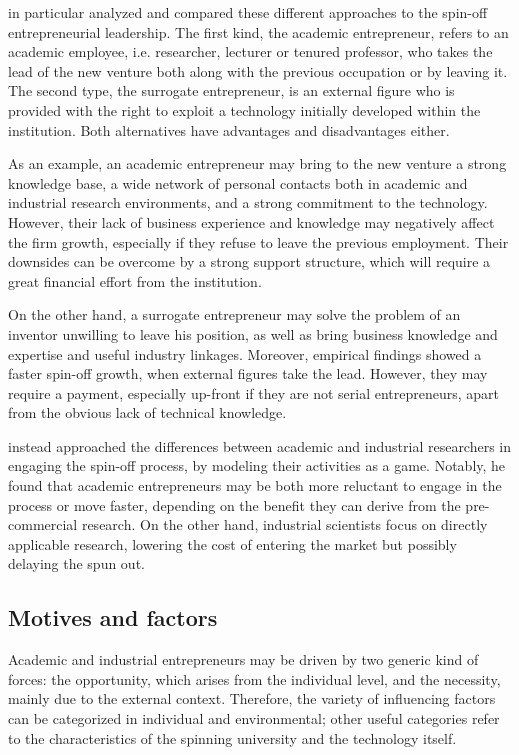 \citet{Radosevich1995} in particular analyzed and compared these different approaches to the spin-off entrepreneurial leadership. The first kind, the academic entrepreneur, refers to an academic employee, i.e. researcher, lecturer or tenured professor, who takes the lead of the new venture both along with the previous occupation or by leaving it. The second type, the surrogate entrepreneur, is an external figure who is provided with the right to exploit a technology initially developed within the institution. Both alternatives have advantages and disadvantages either.

As an example, an academic entrepreneur may bring to the new venture a strong knowledge base, a wide network of personal contacts both in academic and industrial research environments, and a strong commitment to the technology. However, their lack of business experience and knowledge may negatively affect the firm growth, especially if they refuse to leave the previous employment. Their downsides can be overcome by a strong support structure, which will require a great financial effort from the institution. 

On the other hand, a surrogate entrepreneur may solve the problem of an inventor unwilling to leave his position, as well as bring business knowledge and expertise and useful industry linkages. Moreover, empirical findings showed a faster spin-off growth, when external figures take the lead. However, they may require a payment, especially up-front if they are not serial entrepreneurs, apart from the obvious lack of technical knowledge. 

\citet{Lacetera2006} instead approached the differences between academic and industrial researchers in engaging the spin-off process, by modeling their activities as a game. Notably, he found that academic entrepreneurs may be both more reluctant to engage in the process or move faster, depending on the benefit they can derive from the pre-commercial research. On the other hand, industrial scientists focus on directly applicable research, lowering the cost of entering the market but possibly delaying the spun out.   

\subsection{Motives and factors}

Academic and industrial entrepreneurs may be driven by two generic kind of forces: the opportunity, which arises from the individual level, and the necessity, mainly due to the external context. Therefore, the variety of influencing factors can be categorized in individual and environmental; other useful categories refer to the characteristics of the spinning university and the technology itself.

